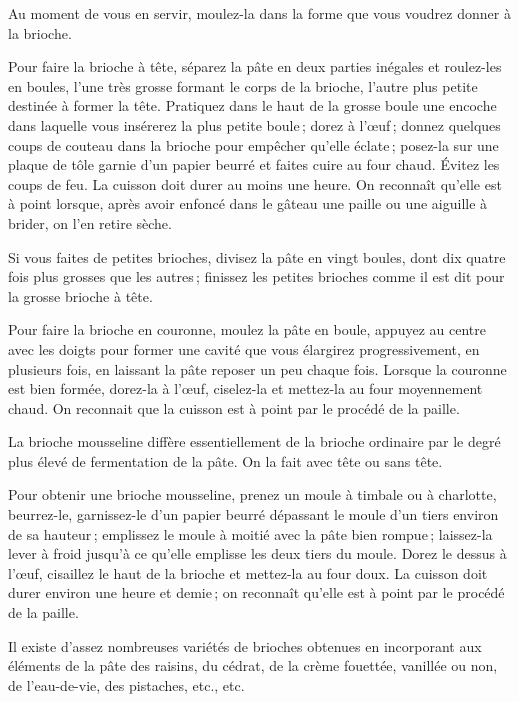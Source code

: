 Au moment de vous en servir, moulez-la dans la forme que vous voudrez donner
à la brioche.

\sk

Pour faire la brioche à tête, séparez la pâte en deux parties inégales et
roulez-les en boules, l'une très grosse formant le corps de la brioche, l'autre
plus petite destinée à former la tête. Pratiquez dans le haut de la grosse
boule une encoche dans laquelle vous insérerez la plus petite boule ; dorez
à l'œuf ; donnez quelques coups de couteau dans la brioche pour empêcher
qu'elle éclate ; posez-la sur une plaque de tôle garnie d'un papier beurré et
faites cuire au four chaud. Évitez les coups de feu. La cuisson doit durer au
moins une heure. On reconnaît qu'elle est à point lorsque, après avoir enfoncé
dans le gâteau une paille ou une aiguille à brider, on l'en retire sèche.

\sk

Si vous faites de petites brioches, divisez la pâte en vingt boules, dont dix
quatre fois plus grosses que les autres ; finissez les petites brioches comme
il est dit pour la grosse brioche à tête.

\sk

Pour faire la brioche en couronne, moulez la pâte en boule, appuyez au centre
avec les doigts pour former une cavité que vous élargirez progressivement, en
plusieurs fois, en laissant la pâte reposer un peu chaque fois. Lorsque la
couronne est bien formée, dorez-la à l'œuf, ciselez-la et mettez-la au four
moyennement chaud. On reconnait que la cuisson est à point par le procédé de la
paille.

\sk

La brioche mousseline diffère essentiellement de la brioche ordinaire par le
degré plus élevé de fermentation de la pâte. On la fait avec tête ou sans tête.

Pour obtenir une brioche mousseline, prenez un moule à timbale ou à charlotte,
beurrez-le, garnissez-le d'un papier beurré dépassant le moule d'un tiers
environ de sa hauteur ; emplissez le moule à moitié avec la pâte bien rompue ;
laissez-la lever à froid jusqu'à ce qu'elle emplisse les deux tiers du moule.
Dorez le dessus à l'œuf, cisaillez le haut de la brioche et mettez-la au four
doux. La cuisson doit durer environ une heure et demie ; on reconnaît qu'elle
est à point par le procédé de la paille.

\sk

Il existe d'assez nombreuses variétés de brioches obtenues en incorporant aux
éléments de la pâte des raisins, du cédrat, de la crème fouettée, vanillée ou
non, de l'eau-de-vie, des pistaches, etc., etc.

